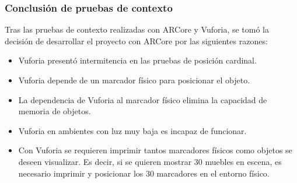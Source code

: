 \subsubsection{Conclusión de pruebas de contexto}
Tras las pruebas de contexto realizadas con ARCore y Vuforia, se tomó la decisión de desarrollar el proyecto con ARCore por las siguientes razones:
\begin{itemize}
	\item Vuforia presentó intermitencia en las pruebas de posición cardinal.
	\item Vuforia depende de un marcador físico para posicionar el objeto.
	\item La dependencia de Vuforia al marcador físico elimina la capacidad de memoria de objetos.
	\item Vuforia en ambientes con luz muy baja es incapaz de funcionar.
	\item Con Vuforia se requieren imprimir tantos marcadores físicos como objetos se deseen visualizar. Es decir, si se quieren mostrar 30 muebles en escena, es necesario imprimir y posicionar los 30 marcadores en el entorno físico.
\end{itemize}

